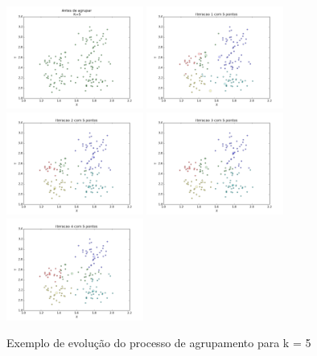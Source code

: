 \documentclass[12pt, a4paper]{article}
\begin{document}
\begin{landscape}
\begin{figure}[!ht]
\label{erros}
  \caption{Exemplo de evolução do processo de agrupamento para k = 5}
  \centering
    \includegraphics[width=0.4\textwidth]{antes_k5.png}
    \includegraphics[width=0.4\textwidth]{depois_1.png}
    \includegraphics[width=0.4\textwidth]{depois_2.png}
    \includegraphics[width=0.4\textwidth]{depois_3.png}
    \includegraphics[width=0.4\textwidth]{depois_4.png}

\end{figure}
\end{landscape}
\end{document}
